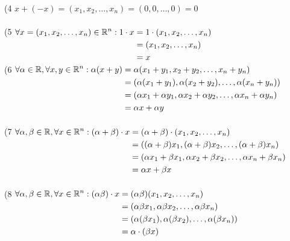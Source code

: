 \begin{example}
\setLR
	\noindent
	(4 $x + (-x) = (x_1, x_2, \dots, x_n)= (0, 0, \dots, 0) = 0$ \\ 
	\\
	(5 $
	\begin{aligned}[t]
			\forall x = (x_1, x_2, \dots, x_n) \in \mathbb{R}^n: 1\cdot x
			&= 1 \cdot (x_1, x_2, \dots, x_n)\\
			&= (x_1, x_2, \dots, x_n) \\
			&= x
	\end{aligned}
$\\
\noindent
(6 $
\begin{aligned}[t]
	\forall \alpha\in\mathbb{R} , \forall x,y \in \mathbb{R}^n: \alpha (x+y)
	&= \alpha(x_1+y_1, x_2+y_2, \dots, x_n+y_n)\\
	&= (\alpha(x_1+y_1), \alpha(x_2+y_2), \dots, \alpha(x_n+y_n))\\
	&= (\alpha x_1+\alpha y_1, \alpha x_2+\alpha y_2, \dots, \alpha x_n+\alpha y_n)\\
	&= \alpha x + \alpha y
\end{aligned}
$\\\\
\noindent
(7 $
\begin{aligned}[t]
	\forall \alpha, \beta \in \mathbb{R}, \forall x\in \mathbb{R}^n: (\alpha + \beta)\cdot x
	&= (\alpha + \beta)\cdot (x_1, x_2, \dots, x_n)\\
	&= ((\alpha+\beta)x_1, (\alpha+\beta)x_2, \dots, (\alpha+\beta)x_n)\\
	&= (\alpha x_1 + \beta x_1, \alpha x_2 + \beta x_2, \dots , \alpha x_n + \beta x_n)\\
	&= \alpha x + \beta x
\end{aligned}
$\\
\\
(8 $
\begin{aligned}[t]
		\forall \alpha, \beta \in \mathbb{R}, \forall x\in \mathbb{R}^n: (\alpha \beta)\cdot x
		&= (\alpha\beta)(x_1, x_2, \dots, x_n)\\
		&= (\alpha\beta x_1, \alpha\beta x_2, \dots, \alpha\beta x_n)\\
		&= (\alpha(\beta x_1), \alpha(\beta x_2), \dots, \alpha(\beta x_n))\\
		&= \alpha \cdot (\beta x)
\end{aligned}
$
\end{example}


